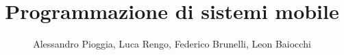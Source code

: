 \documentclass[a4paper,12pt]{report}
\title{\textbf{Programmazione di sistemi mobile}}
\author{Alessandro Pioggia, Luca Rengo, Federico Brunelli, Leon Baiocchi}
\begin{document}
	\makeatletter
	\begin{titlepage}
		\begin{center}
			{\Huge  \@title }\\[3ex] 
			{\large  \@author}\\[3ex] 
			{\large \@date}
		\end{center}
	\end{titlepage}
	\makeatother
	\thispagestyle{empty}
	\newpage
	
	
	\tableofcontents
	
	
	
	\newpage
	
	
	
	
	
	
	
	
\end{document}
